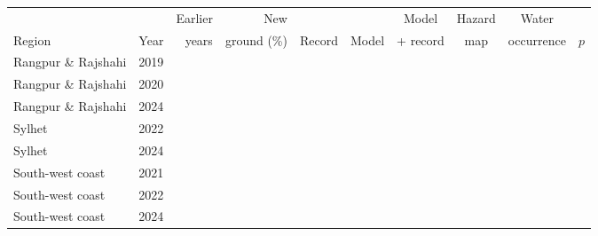 \documentclass[10pt,a4paper,twocolumn]{article}
\begin{document}
\begin{table}[tp]
\centering
\footnotesize
\setlength{\tabcolsep}{4pt}
\begin{tabular}{llrrcccccc}
\toprule
 & & Earlier & New & & & Model & Hazard & Water & \\
Region & Year & years & ground (\%) & Record & Model & + record & map & occurrence & $p$ \\
\midrule
Rangpur \& Rajshahi & 2019 & \RRRollNineteenYears{} & \RRRollNineteenNewGround{} & \RRRollNineteenRecord{} & \RRRollNineteenModel{} & \RRRollNineteenBoth{} & \RRRollNineteenMap{} & \RRRollNineteenOcc{} & \RRRollNineteenPTab{} \\
Rangpur \& Rajshahi & 2020 & \RRRollTwentyYears{} & \RRRollTwentyNewGround{} & \RRRollTwentyRecord{} & \RRRollTwentyModel{} & \RRRollTwentyBoth{} & \RRRollTwentyMap{} & \RRRollTwentyOcc{} & \RRRollTwentyPTab{} \\
Rangpur \& Rajshahi & 2024 & \RRRollTwentyFourYears{} & \RRRollTwentyFourNewGround{} & \RRRollTwentyFourRecord{} & \RRRollTwentyFourModel{} & \RRRollTwentyFourBoth{} & \RRRollTwentyFourMap{} & \RRRollTwentyFourOcc{} & \RRRollTwentyFourPTab{} \\
Sylhet & 2022 & \SylhetRollTwentyTwoYears{} & \SylhetRollTwentyTwoNewGround{} & \SylhetRollTwentyTwoRecord{} & \SylhetRollTwentyTwoModel{} & \SylhetRollTwentyTwoBoth{} & \SylhetRollTwentyTwoMap{} & \SylhetRollTwentyTwoOcc{} & \SylhetRollTwentyTwoPTab{} \\
Sylhet & 2024 & \SylhetRollTwentyFourYears{} & \SylhetRollTwentyFourNewGround{} & \SylhetRollTwentyFourRecord{} & \SylhetRollTwentyFourModel{} & \SylhetRollTwentyFourBoth{} & \SylhetRollTwentyFourMap{} & \SylhetRollTwentyFourOcc{} & \SylhetRollTwentyFourPTab{} \\
South-west coast & 2021 & \CoastalRollTwentyOneYears{} & \CoastalRollTwentyOneNewGround{} & \CoastalRollTwentyOneRecord{} & \CoastalRollTwentyOneModel{} & \CoastalRollTwentyOneBoth{} & \CoastalRollTwentyOneMap{} & \CoastalRollTwentyOneOcc{} & \CoastalRollTwentyOnePTab{} \\
South-west coast & 2022 & \CoastalRollTwentyTwoYears{} & \CoastalRollTwentyTwoNewGround{} & \CoastalRollTwentyTwoRecord{} & \CoastalRollTwentyTwoModel{} & \CoastalRollTwentyTwoBoth{} & \CoastalRollTwentyTwoMap{} & \CoastalRollTwentyTwoOcc{} & \CoastalRollTwentyTwoPTab{} \\
South-west coast & 2024 & \CoastalRollTwentyFourYears{} & \CoastalRollTwentyFourNewGround{} & \CoastalRollTwentyFourRecord{} & \CoastalRollTwentyFourModel{} & \CoastalRollTwentyFourBoth{} & \CoastalRollTwentyFourMap{} & \CoastalRollTwentyFourOcc{} & \CoastalRollTwentyFourPTab{} \\

\end{tabular}
\end{table}
\end{document}
